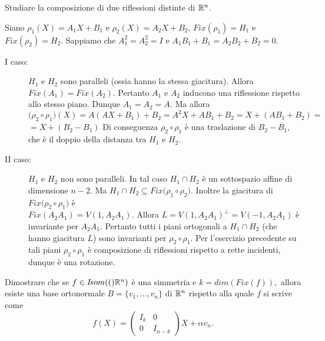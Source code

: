\documentclass[a4paper,12pt]{article}
\newcommand{\Got}[1]{#1}
\newcommand{\got}[1]{{#1}}
\begin{document}
 \begin{exercise}
 \Got{Studiare la composizione di due riflessioni distinte di} $\got{\R^n}$.
 \end{exercise}
 
 \begin{soluzione}
\Got{Siano} $\got{\rho_1(X)=A_1X+B_1}$ \Got{e} $\got{\rho_2(X)=A_2X+B_2}$, $\got{Fix(\rho_1)=H_1}$ \Got{e}\\
 $\got{Fix(\rho_2)=H_2}$. 
 \Got{Sappiamo che} $\got{A_1^2=A_2^2=I}$ \Got{e} $\got{A_1B_1+B_1=A_2B_2+B_2=0}$.
 
 \begin{description}
  \item[I caso:] \Got{}$\got{H_1}$ \Got{e} $\got{H_2}$ \Got{sono paralleli (ossia hanno la stessa giacitura).
 Allora} $\got{Fix(A_1)=Fix(A_2)}$. \Got{Pertanto} $\got{A_1}$ \Got{e} $\got{A_2}$ \Got{inducono una riflessione rispetto allo stesso piano.
 Dunque} $\got{A_1=A_2=A}$.
 \Got{Ma allora} $\got{(\rho_2}\circ\got{\rho_1)(X)=A(AX+B_1)+B_2=A^2X+AB_1+B_2=X+(AB_1+B_2)=}$\\
 $\got{=X+(B_2-B_1)}$
 \Got{Di conseguenza} $\got{\rho_2}\circ\got{\rho_1}$ \Got{è una traslazione di} $\got{B_2-B_1}$, \Got{che è il doppio della distanza tra}
 $\got{H_1}$ \Got{e} $\got{H_2}$.
 \item[II caso: ] \Got{}$\got{H_1}$ \Got{e} $\got{H_2}$ \Got{non sono paralleli.}
 \Got{In tal caso} $\got{H_1\cap H_2}$ \Got{è un sottospazio affine di dimensione} $\got{n-2}$.
 \Got{Ma} $\got{H_1\cap H_2\subseteq Fix(\rho_1}\circ\got{\rho_2)}$.
 \Got{Inoltre la giacitura di} $\got{Fix(\rho_2}\circ\got{\rho_1)}$ \Got{è}\\
 $\got{Fix(A_2A_1)=V(1,A_2A_1)}$. \Got{Allora} $\got{L=V(1,A_2A_1)^{\bot}=V(-1,A_2A_1)}$ \Got{è invariante per} $\got{A_2A_1}$.
 \Got{Pertanto tutti i piani ortogonali a} $\got{H_1\cap H_2}$ \Got{(che hanno giacitura} $\got{L}$) \Got{sono invarianti per}
 $\got{\rho_2}\circ\got{\rho_1}$.
 \Got{Per l'esercizio precedente su tali piani} $\got{\rho_2}\circ\got{\rho_1}$ \Got{è composizione di riflessioni rispetto a rette incidenti,
 dunque è una rotazione.}
 \end{description}
 \end{soluzione}
 
 \begin{exercise}
\Got{Dimostrare che se} $\got{f\in \Isom(\R^n)}$ \Got{è una simmetria e}
 $\got{k=dim(Fix(f)),}$ \Got{allora esiste una base ortonormale} $\got{B=\{v_1,\ldots,v_n\}}$ \Got{di} $\got{\R^n}$ \Got{rispetto alla quale}
 $\got{f}$ \Got{si scrive come}
 $$\got{f(X)}=\left(
 \begin{array}{cc}
  \got{I_k} & \got{0}\\
  \got{0} & \got{I_{n-k}}
 \end{array}
 \right)
 \got{X+\alpha v_n}.
 $$
 \end{exercise}
 
\end{document}

